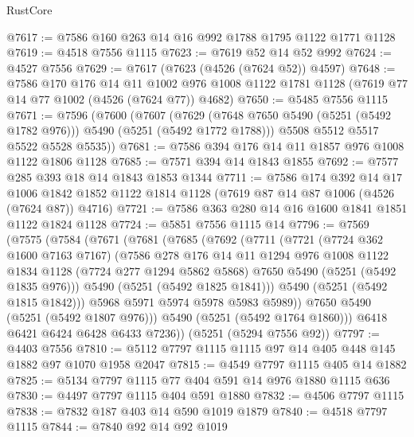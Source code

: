 \begin{lexlean}{RustCore}
\begin{coremodule}
@7617 := @7586 @160 @263 @14 @16 @992 @1788 @1795 @1122 @1771 @1128
@7619 := @4518 @7556 @1115
@7623 := @7619 @52 @14 @52 @992
@7624 := @4527 @7556
@7629 := @7617 (@7623 (@4526 (@7624 @52)) @4597)
@7648 := @7586
    @170
    @176
    @14
    @11
    @1002
    @976
    @1008
    @1122
    @1781
    @1128
    (@7619 @77 @14 @77 @1002 (@4526 (@7624 @77)) @4682)
@7650 := @5485 @7556 @1115
@7671 := @7596
    (@7600
      (@7607
        (@7629 (@7648 @7650 @5490 (@5251 (@5492 @1782 @976))) @5490 (@5251 (@5492 @1772 @1788)))
        @5508
        @5512
        @5517
        @5522
        @5528
        @5535))
@7681 := @7586 @394 @176 @14 @11 @1857 @976 @1008 @1122 @1806 @1128
@7685 := @7571 @394 @14 @1843 @1855
@7692 := @7577 @285 @393 @18 @14 @1843 @1853 @1344
@7711 := @7586
    @174
    @392
    @14
    @17
    @1006
    @1842
    @1852
    @1122
    @1814
    @1128
    (@7619 @87 @14 @87 @1006 (@4526 (@7624 @87)) @4716)
@7721 := @7586 @363 @280 @14 @16 @1600 @1841 @1851 @1122 @1824 @1128
@7724 := @5851 @7556 @1115 @14
@7796 := @7569
    (@7575
      (@7584
        (@7671
          (@7681
            (@7685
              (@7692
                (@7711
                  (@7721
                    (@7724 @362 @1600 @7163 @7167)
                    (@7586
                      @278
                      @176
                      @14
                      @11
                      @1294
                      @976
                      @1008
                      @1122
                      @1834
                      @1128
                      (@7724 @277 @1294 @5862 @5868)
                      @7650
                      @5490
                      (@5251 (@5492 @1835 @976)))
                    @5490
                    (@5251 (@5492 @1825 @1841)))
                  @5490
                  (@5251 (@5492 @1815 @1842)))
                @5968
                @5971
                @5974
                @5978
                @5983
                @5989))
            @7650
            @5490
            (@5251 (@5492 @1807 @976)))
          @5490
          (@5251 (@5492 @1764 @1860)))
        @6418
        @6421
        @6424
        @6428
        @6433
        @7236))
    (@5251 (@5294 @7556 @92))
@7797 := @4403 @7556
@7810 := @5112 @7797 @1115 @1115 @97 @14 @405 @448 @145 @1882 @97 @1070 @1958 @2047
@7815 := @4549 @7797 @1115 @405 @14 @1882
@7825 := @5134 @7797 @1115 @77 @404 @591 @14 @976 @1880 @1115 @636
@7830 := @4497 @7797 @1115 @404 @591 @1880
@7832 := @4506 @7797 @1115
@7838 := @7832 @187 @403 @14 @590 @1019 @1879
@7840 := @4518 @7797 @1115
@7844 := @7840 @92 @14 @92 @1019

\end{coremodule}
\end{lexlean}
